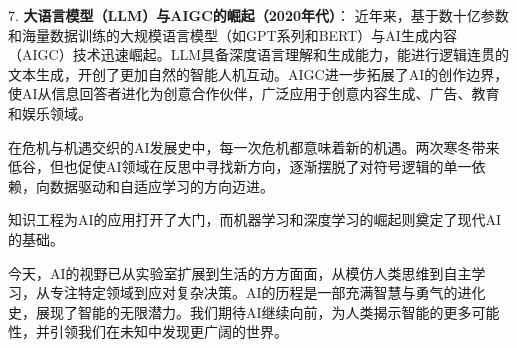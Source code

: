 7. {\bf 大语言模型（LLM）与{\bf AIGC}的崛起（2020年代）}：
近年来，基于数十亿参数和海量数据训练的大规模语言模型（如GPT系列和BERT）与AI生成内容（AIGC）技术迅速崛起。LLM具备深度语言理解和生成能力，能进行逻辑连贯的文本生成，开创了更加自然的智能人机互动。AIGC进一步拓展了AI的创作边界，使AI从信息回答者进化为创意合作伙伴，广泛应用于创意内容生成、广告、教育和娱乐领域。

在危机与机遇交织的AI发展史中，每一次危机都意味着新的机遇。两次寒冬带来低谷，但也促使AI领域在反思中寻找新方向，逐渐摆脱了对符号逻辑的单一依赖，向数据驱动和自适应学习的方向迈进。

知识工程为AI的应用打开了大门，而机器学习和深度学习的崛起则奠定了现代AI的基础。

今天，AI的视野已从实验室扩展到生活的方方面面，从模仿人类思维到自主学习，从专注特定领域到应对复杂决策。AI的历程是一部充满智慧与勇气的进化史，展现了智能的无限潜力。我们期待AI继续向前，为人类揭示智能的更多可能性，并引领我们在未知中发现更广阔的世界。




\nocite{*}
\printbibliography[heading=bibintoc, title=\ebibname]



\newpage


